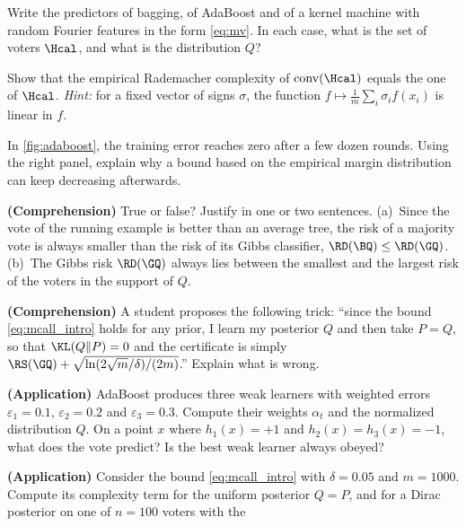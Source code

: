 \begin{exercises}
\begin{exercise}
Write the predictors of bagging, of AdaBoost and of a kernel machine with random
Fourier features in the form \eqref{eq:mv}. In each case, what is the set of
voters $\Hcal$, and what is the distribution $Q$?
\end{exercise}
\begin{exercise}\label{ex:conv}
Show that the empirical Rademacher complexity of $\mathrm{conv}(\Hcal)$ equals the
one of $\Hcal$. \emph{Hint:} for a fixed vector of signs $\sigma$, the function
$f\mapsto\frac1m\sum_i\sigma_if(x_i)$ is linear in $f$.
\end{exercise}
\begin{exercise}
In \cref{fig:adaboost}, the training error reaches zero after a few dozen
rounds. Using the right panel, explain why a bound based on the empirical
margin distribution can keep decreasing afterwards.
\end{exercise}
\begin{exercise}
\textbf{(Comprehension)} True or false? Justify in one or two sentences.
(a)~Since the vote of the running example is better than an average tree, the
risk of a majority vote is always smaller than the risk of its Gibbs classifier,
$\RD(\BQ)\leq\RD(\GQ)$. (b)~The Gibbs risk $\RD(\GQ)$ always lies between the
smallest and the largest risk of the voters in the support of $Q$.
\end{exercise}
\begin{exercise}
\textbf{(Comprehension)} A student proposes the following trick: ``since the
bound \eqref{eq:mcall_intro} holds for any prior, I learn my posterior $Q$ and
then take $P=Q$, so that $\KL(Q\|P)=0$ and the certificate is simply
$\RS(\GQ)+\sqrt{\ln(2\sqrt m/\delta)/(2m)}$.'' Explain what is wrong.
\end{exercise}
\begin{exercise}
\textbf{(Application)} AdaBoost produces three weak learners with weighted
errors $\varepsilon_1=0.1$, $\varepsilon_2=0.2$ and $\varepsilon_3=0.3$.
Compute their weights $\alpha_t$ and the normalized distribution $Q$. On a point
$x$ where $h_1(x)=+1$ and $h_2(x)=h_3(x)=-1$, what does the vote predict? Is
the best weak learner always obeyed?
\end{exercise}
\begin{exercise}
\textbf{(Application)} Consider the bound \eqref{eq:mcall_intro} with
$\delta=0.05$ and $m=1000$. Compute its complexity term for the uniform
posterior $Q=P$, and for a Dirac posterior on one of $n=100$ voters with the

\end{exercise}
\end{exercises}
